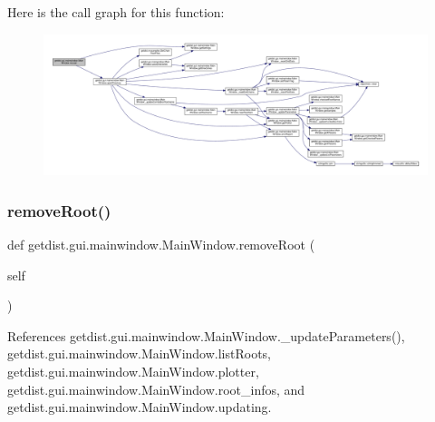 Here is the call graph for this function\+:
\nopagebreak
\begin{figure}[H]
\begin{center}
\leavevmode
\includegraphics[width=350pt]{classgetdist_1_1gui_1_1mainwindow_1_1MainWindow_ad64925d8336c287f82ae6e2f16d9de71_cgraph}
\end{center}
\end{figure}
\mbox{\label{classgetdist_1_1gui_1_1mainwindow_1_1MainWindow_a201a21f90476804e9c5917012c06add2}} 
\subsubsection{\texorpdfstring{remove\+Root()}{removeRoot()}}
{\footnotesize\ttfamily def getdist.\+gui.\+mainwindow.\+Main\+Window.\+remove\+Root (\begin{DoxyParamCaption}\item[{}]{self }\end{DoxyParamCaption})}



References getdist.\+gui.\+mainwindow.\+Main\+Window.\+\_\+update\+Parameters(), getdist.\+gui.\+mainwindow.\+Main\+Window.\+list\+Roots, getdist.\+gui.\+mainwindow.\+Main\+Window.\+plotter, getdist.\+gui.\+mainwindow.\+Main\+Window.\+root\+\_\+infos, and getdist.\+gui.\+mainwindow.\+Main\+Window.\+updating.


